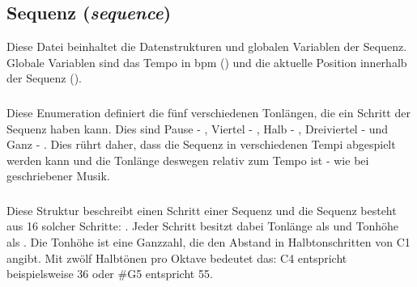 \subsection{Sequenz (\emph{sequence})}
Diese Datei beinhaltet die Datenstrukturen und globalen Variablen der Sequenz. Globale Variablen sind das Tempo in bpm () und die aktuelle Position innerhalb der Sequenz ().

\subsubsection{}
Diese Enumeration definiert die fünf verschiedenen Tonlängen, die ein Schritt der Sequenz haben kann. Dies sind Pause - , Viertel - , Halb - , Dreiviertel -  und Ganz - . Dies rührt daher, dass die Sequenz in verschiedenen Tempi abgespielt werden kann und die Tonlänge deswegen relativ zum Tempo ist - wie bei geschriebener Musik.

\subsubsection{}
Diese Struktur beschreibt einen Schritt einer Sequenz und die Sequenz besteht aus 16 solcher Schritte: . Jeder Schritt besitzt dabei Tonlänge als  und Tonhöhe als . Die Tonhöhe ist eine Ganzzahl, die den Abstand in Halbtonschritten von C1 angibt. Mit zwölf Halbtönen pro Oktave bedeutet das: C4 entspricht beispielsweise 36 oder \#G5 entspricht 55.
